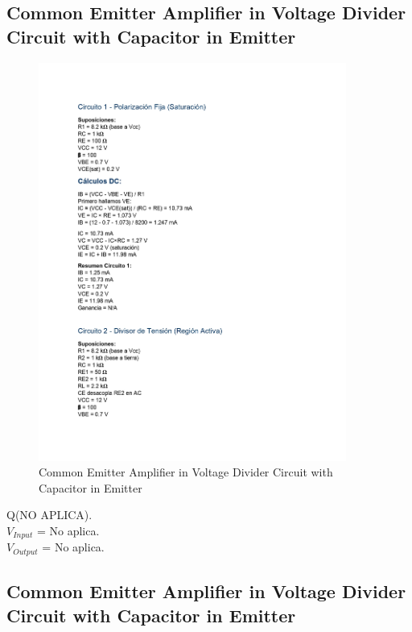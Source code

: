 \subsection{Common Emitter Amplifier in Voltage Divider Circuit with Capacitor in Emitter}

\begin{figure}[H]
    \centering
    \includegraphics[width = 0.9\textwidth]{Imagenes/Imagenes_Santiago/BJT1.jpg}
    \caption{Common Emitter Amplifier in Voltage Divider Circuit with Capacitor in Emitter}
    \label{circuit1Teorico}
\end{figure}

\begin{center}
    Q(NO APLICA). \\
    \texorpdfstring{$V_{Input}$}{Vinput} = No aplica. \\
    \texorpdfstring{$V_{Output}$}{Voutput} = No aplica.
\end{center}

\subsection{Common Emitter Amplifier in Voltage Divider Circuit with Capacitor in Emitter}

